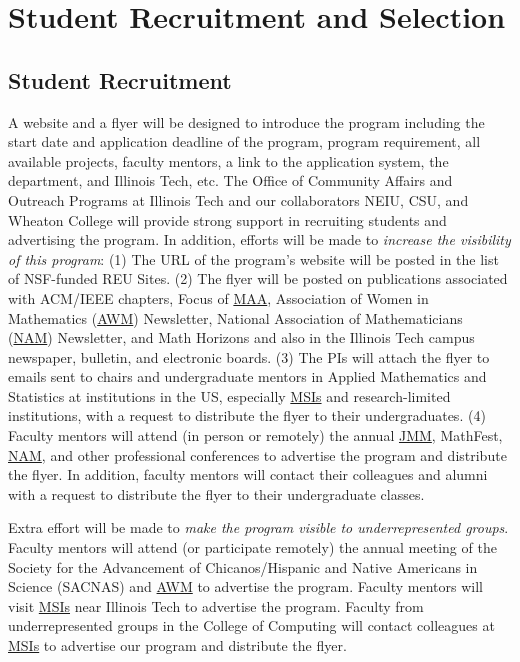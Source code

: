 \documentclass[11pt]{NSFamsart}
\newcommand{\MAA}{\hyperlink{MAAlink}{MAA}\xspace}
\newcommand{\JMM}{\hyperlink{JMMlink}{JMM}\xspace}
\newcommand{\AWM}{\hyperlink{AWMlink}{AWM}\xspace}
\newcommand{\NAM}{\hyperlink{NAMlink}{NAM}\xspace}
\newcommand{\MSIs}{\hyperlink{MSIlink}{MSIs}\xspace}
\begin{document}
\section{Student Recruitment and Selection}
\subsection{Student Recruitment} A website and a flyer will be designed to introduce the program including the start date and application deadline of the program, program requirement,  
all available projects, faculty mentors, a link to the application system, the department, and Illinois Tech, etc. The Office of Community Affairs and Outreach Programs at Illinois Tech and our collaborators NEIU, CSU, and Wheaton College  will provide strong support in recruiting students and advertising the program. In addition,
efforts will be made to 
\emph{increase the visibility of this program}: 
(1) 
The URL of the program’s
website \cite{SUREWeb} will be posted in the list of NSF-funded REU Sites. 
(2) The flyer will be posted on publications associated with ACM/IEEE chapters, Focus of \MAA, \hypertarget{AWMlink}{Association of Women in Mathematics} (\AWM)
Newsletter, \hypertarget{NAMlink}{ National Association of Mathematicians} (\NAM) Newsletter, and Math Horizons and also in the Illinois Tech campus newspaper, bulletin, and electronic boards.
(3) 
The PIs will attach the flyer to emails sent to
chairs and undergraduate mentors in Applied Mathematics and Statistics at institutions in the US, especially
\MSIs and research-limited institutions, with a request to distribute the flyer to their undergraduates. 
(4) Faculty mentors will attend (in person or remotely)
the annual \JMM, MathFest, \NAM, and other professional conferences to advertise the
program and distribute the flyer. In addition, faculty mentors will contact their colleagues and alumni with a request to
distribute the flyer to their undergraduate classes.

Extra effort will be made to 
\emph{make the program visible to underrepresented groups}.
Faculty mentors will attend (or participate remotely) the annual meeting of the Society for the Advancement of Chicanos/Hispanic and Native Americans in Science  (SACNAS) and 
\AWM to advertise the program.
Faculty mentors will visit 
\MSIs near Illinois Tech to advertise the program.
 Faculty from underrepresented groups in the College of Computing will contact colleagues at \MSIs to advertise our
 program and distribute the flyer.
 
\end{document}
